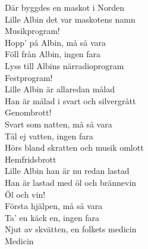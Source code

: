 \documentclass[11pt]{book}
\begin{document}
\noindent
\begin{minipage}{0.45\textwidth}
	Där byggdes en maskot i Norden\\
	Lille Albin det var maskotens namn\\
	Musikprogram!\\

	\noindent
	Hopp' på Albin, må så vara\\
	Föll från Albin, ingen fara\\
	Lyss till Albins närradioprogram \\
	Festprogram!\\

	\noindent
	Lille Albin är allaredan målad\\
	Han är målad i svart och silvergrått\\
	Genombrott!\\

	\noindent
	Svart som natten, må så vara\\
	Tål ej vatten, ingen fara\\
	Hörs bland skratten och musik omlott\\
	Hemfridsbrott\\

	\noindent
	Lille Albin han är nu redan lastad\\
	Han är lastad med öl och brännevin\\
	Öl och vin!\\

	\noindent
	Första hjälpen, må så vara\\
	Ta' en käck en, ingen fara\\
	Njut av skvätten, en folkets medicin\\
	Medicin\\


\end{minipage}%
\hspace{0.05\textwidth}
\noindent
\end{document}
